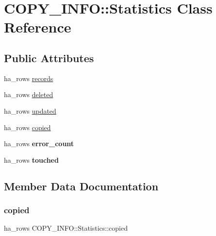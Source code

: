\hypertarget{classCOPY__INFO_1_1Statistics}{}\section{C\+O\+P\+Y\+\_\+\+I\+N\+FO\+:\+:Statistics Class Reference}
\label{classCOPY__INFO_1_1Statistics}
\subsection*{Public Attributes}
\begin{DoxyCompactItemize}
\item 
ha\+\_\+rows \mbox{\hyperlink{classCOPY__INFO_1_1Statistics_a8f30dc30330f955a540e8c36af40e70a}{records}}
\item 
ha\+\_\+rows \mbox{\hyperlink{classCOPY__INFO_1_1Statistics_a436e1af0bba731ad92045160e19d4479}{deleted}}
\item 
ha\+\_\+rows \mbox{\hyperlink{classCOPY__INFO_1_1Statistics_aff87e80b064736d9fa489403a5416e85}{updated}}
\item 
ha\+\_\+rows \mbox{\hyperlink{classCOPY__INFO_1_1Statistics_aac7aec1bc26ddc1c5f3183845530bb9d}{copied}}
\item 
\mbox{\label{classCOPY__INFO_1_1Statistics_af26d9ea6388ca48a9513ab33bc3441be}} 
ha\+\_\+rows {\bfseries error\+\_\+count}
\item 
\mbox{\label{classCOPY__INFO_1_1Statistics_ab2ba63088fe0d062fb8bc4ab410ec1e9}} 
ha\+\_\+rows {\bfseries touched}
\end{DoxyCompactItemize}


\subsection{Member Data Documentation}
\mbox{\label{classCOPY__INFO_1_1Statistics_aac7aec1bc26ddc1c5f3183845530bb9d}} 
\subsubsection{\texorpdfstring{copied}{copied}}
{\footnotesize\ttfamily ha\+\_\+rows C\+O\+P\+Y\+\_\+\+I\+N\+F\+O\+::\+Statistics\+::copied}

